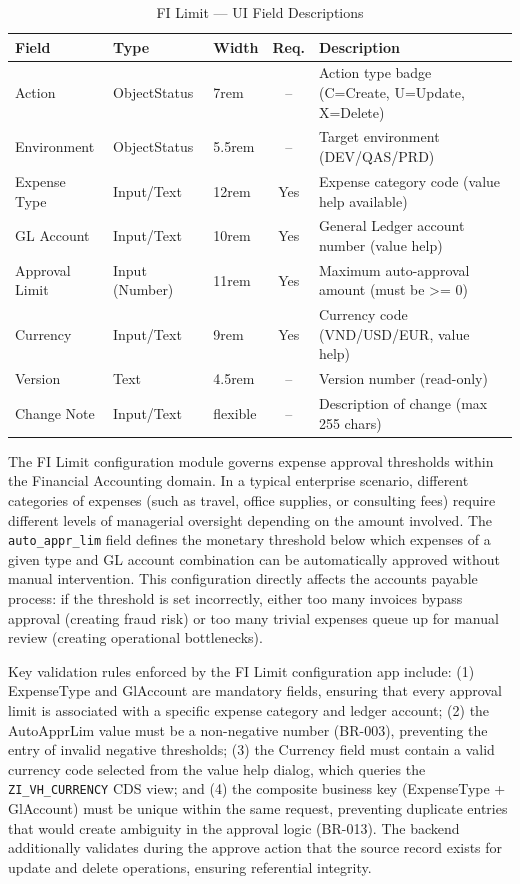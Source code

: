 \documentclass[12pt,a4paper]{report}
\begin{document}
\begin{table}[H]
\centering\small
\begin{tabularx}{\textwidth}{|l|l|l|c|X|}
  \hline
  \rowcolor{tableheadpeach}
  \textbf{Field} & \textbf{Type} & \textbf{Width} & \textbf{Req.} & \textbf{Description} \\ \hline
  Action & ObjectStatus & 7rem & -- & Action type badge (C=Create, U=Update, X=Delete) \\ \hline
  Environment & ObjectStatus & 5.5rem & -- & Target environment (DEV/QAS/PRD) \\ \hline
  Expense Type & Input/Text & 12rem & Yes & Expense category code (value help available) \\ \hline
  GL Account & Input/Text & 10rem & Yes & General Ledger account number (value help) \\ \hline
  Approval Limit & Input (Number) & 11rem & Yes & Maximum auto-approval amount (must be >= 0) \\ \hline
  Currency & Input/Text & 9rem & Yes & Currency code (VND/USD/EUR, value help) \\ \hline
  Version & Text & 4.5rem & -- & Version number (read-only) \\ \hline
  Change Note & Input/Text & flexible & -- & Description of change (max 255 chars) \\ \hline
\end{tabularx}
\caption{FI Limit --- UI Field Descriptions}
\label{tab:ui-fi-fields}
\end{table}

The FI Limit configuration module governs expense approval thresholds within the Financial Accounting domain. In a typical enterprise scenario, different categories of expenses (such as travel, office supplies, or consulting fees) require different levels of managerial oversight depending on the amount involved. The \texttt{auto\_appr\_lim} field defines the monetary threshold below which expenses of a given type and GL account combination can be automatically approved without manual intervention. This configuration directly affects the accounts payable process: if the threshold is set incorrectly, either too many invoices bypass approval (creating fraud risk) or too many trivial expenses queue up for manual review (creating operational bottlenecks).

Key validation rules enforced by the FI Limit configuration app include: (1) ExpenseType and GlAccount are mandatory fields, ensuring that every approval limit is associated with a specific expense category and ledger account; (2) the AutoApprLim value must be a non-negative number (BR-003), preventing the entry of invalid negative thresholds; (3) the Currency field must contain a valid currency code selected from the value help dialog, which queries the \texttt{ZI\_VH\_CURRENCY} CDS view; and (4) the composite business key (ExpenseType + GlAccount) must be unique within the same request, preventing duplicate entries that would create ambiguity in the approval logic (BR-013). The backend additionally validates during the approve action that the source record exists for update and delete operations, ensuring referential integrity.
\end{document}
